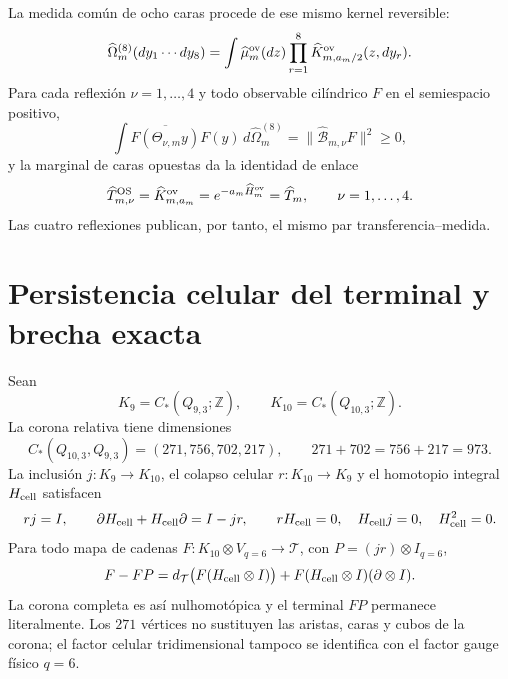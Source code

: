 La medida común de ocho caras procede de ese mismo kernel reversible:
\begin{equation}\label{eq:realizaciones-ym-medida-ocho}
 \widehat\Omega_m^{(8)}(dy_1\cdots dy_8)
 =\int\widehat\mu_m^{\rm ov}(dz)
   \prod_{r=1}^{8}
   \widehat K_{m,a_m/2}^{\rm ov}(z,dy_r).
\end{equation}
Para cada reflexión \(\nu=1,\ldots,4\) y todo observable cilíndrico \(F\)
en el semiespacio positivo,
\begin{equation}\label{eq:realizaciones-ym-os}
 \int\overline{F(\Theta_{\nu,m}y)}F(y)\,
 d\widehat\Omega_m^{(8)}
 =\|\widehat{\mathcal B}_{m,\nu}F\|^2\geq0,
\end{equation}
y la marginal de caras opuestas da la identidad de enlace
\begin{equation}\label{eq:realizaciones-ym-os-transferencia}
 \widehat T_{m,\nu}^{\rm OS}
 =\widehat K_{m,a_m}^{\rm ov}
 =e^{-a_m\widehat H_m^{\rm ov}}
 =\widehat T_m,
 \qquad \nu=1,\ldots,4.
\end{equation}
Las cuatro reflexiones publican, por tanto, el mismo par
transferencia--medida.

\section*{Persistencia celular del terminal y brecha exacta}

Sean
\[
 K_9=C_*(Q_{9,3};\mathbb Z),\qquad
 K_{10}=C_*(Q_{10,3};\mathbb Z).
\]
La corona relativa tiene dimensiones
\[
 C_*(Q_{10,3},Q_{9,3})=(271,756,702,217),
 \qquad 271+702=756+217=973.
\]
La inclusión \(j:K_9\to K_{10}\), el colapso celular
\(r:K_{10}\to K_9\) y el homotopio integral \(H_{\rm cell}\) satisfacen
\begin{equation}\label{eq:realizaciones-ym-sdr-corona}
 rj=I,\qquad
 \partial H_{\rm cell}+H_{\rm cell}\partial=I-jr,\qquad
 rH_{\rm cell}=0,\quad H_{\rm cell}j=0,\quad H_{\rm cell}^2=0.
\end{equation}
Para todo mapa de cadenas
\(F:K_{10}\otimes V_{q=6}\to\mathcal T\), con
\(P=(jr)\otimes I_{q=6}\),
\begin{equation}\label{eq:realizaciones-ym-homotopia-terminal}
 F-FP
 =d_{\mathcal T}\bigl(F(H_{\rm cell}\otimes I)\bigr)
  +F(H_{\rm cell}\otimes I)(\partial\otimes I).
\end{equation}
La corona completa es así nulhomotópica y el terminal \(FP\) permanece
literalmente. Los \(271\) vértices no sustituyen las aristas, caras y cubos
de la corona; el factor celular tridimensional tampoco se identifica con el
factor gauge físico \(q=6\).

